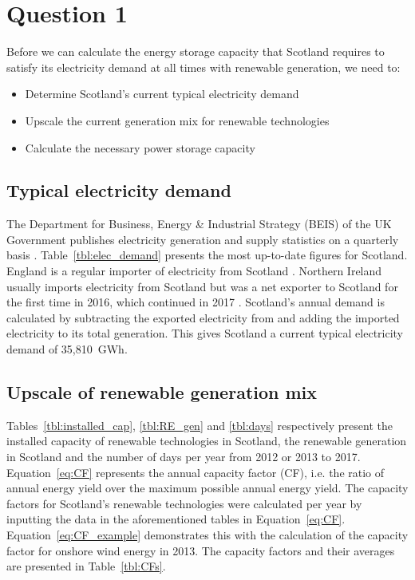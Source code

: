 \section{Question 1}



Before we can calculate the energy storage capacity that Scotland requires to satisfy its electricity demand at all times with renewable generation, we need to:
\begin{itemize}
	\item Determine Scotland's current typical electricity demand
	\item Upscale the current generation mix for renewable technologies
	\item Calculate the necessary power storage capacity
\end{itemize}




\subsection{Typical electricity demand}

The Department for Business, Energy {\&} Industrial Strategy (BEIS) of the UK Government publishes electricity generation and supply statistics on a quarterly basis \citep{BEIS2018ElecUK}.
Table~\ref{tbl:elec_demand} presents the most up-to-date figures for Scotland.
England is a regular importer of electricity from Scotland \citep{BEIS2018EnergyTrends}.
Northern Ireland usually imports electricity from Scotland but was a net exporter to Scotland for the first time in 2016, which continued in 2017 \citep{BEIS2018EnergyTrends}.
Scotland's annual demand is calculated by subtracting the exported electricity from and adding the imported electricity to its total generation.
This gives Scotland a current typical electricity demand of 35,810~GWh.






\subsection{Upscale of renewable generation mix}

Tables~\ref{tbl:installed_cap}, \ref{tbl:RE_gen} and \ref{tbl:days} respectively present the installed capacity of renewable technologies in Scotland, the renewable generation in Scotland and the number of days per year from 2012 or 2013 to 2017.
Equation~\ref{eq:CF} represents the annual capacity factor (CF), i.e. the ratio of annual energy yield over the maximum possible annual energy yield.
The capacity factors for Scotland's renewable technologies were calculated per year by inputting the data in the aforementioned tables in Equation~\ref{eq:CF}.
Equation~\ref{eq:CF_example} demonstrates this with the calculation of the capacity factor for onshore wind energy in 2013.
The capacity factors and their averages are presented in Table~\ref{tbl:CFs}.

